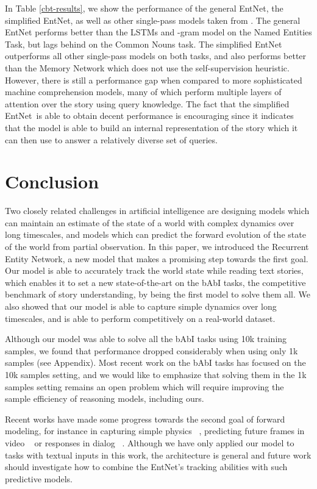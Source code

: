 \documentclass{article} \usepackage{iclr2016_conference,times}
\newcommand{\modelname}{Recurrent Entity Network}
\newcommand{\modelabbrev}{EntNet}
\begin{document}
In Table \ref{cbt-results}, we show the performance of the general EntNet, the simplified EntNet, as well as other single-pass models taken from \citep{CBT}.
The general EntNet performs better than the LSTMs and -gram model on the Named Entities Task, but lags behind on the Common Nouns task. 
The simplified EntNet outperforms all other single-pass models on both tasks, and also performs better than the Memory Network which does not use the self-supervision heuristic. 
However, there is still a performance gap when compared to more sophisticated machine comprehension models, many of which perform multiple layers of attention over the story using query knowledge.
The fact that the simplified \modelabbrev~is able to obtain decent performance is encouraging since it indicates that the model is able to build an internal representation of the story which it can then use to answer a relatively diverse set of queries.


\section{Conclusion}

Two closely related challenges in artificial intelligence are designing models which can maintain an estimate of the state of a world with complex dynamics over long timescales, and models which can predict the forward evolution of the state of the world from partial observation.
In this paper, we introduced the \modelname, a new model that makes a
promising step towards the first goal. Our model is able to accurately track the world state while reading text
stories, which enables it to set a new
state-of-the-art on the bAbI tasks, the competitive benchmark of story
understanding, by being the first model to solve them all.
We also showed that our model is able to capture simple dynamics over long timescales, and is able to perform competitively on a real-world dataset.

Although our model was able to solve all the bAbI tasks using 10k training samples, we found that performance dropped considerably when using only 1k samples (see Appendix). 
Most recent work on the bAbI tasks has focused on the 10k samples setting, and we would like to emphasize that solving them in the 1k samples setting remains an open problem which will require improving the sample efficiency of reasoning models, including ours.


Recent works have made some progress towards the second goal of forward modeling, for instance in capturing simple physics ~\citep{lerer-icml-2016}, predicting future frames in video ~\citep{mathieu-iclr-2016} or responses in dialog ~\citep{weston16}. 
Although we have only applied our model to tasks with textual inputs in this work, the architecture is general and future work should investigate how to combine the \modelabbrev's tracking abilities with such predictive models.
\end{document}
